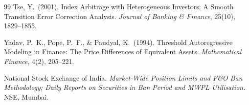 \begin{thebibliography}{99}
 Tse, Y.\ (2001). Index Arbitrage with Heterogeneous Investors: A Smooth Transition Error Correction Analysis. \emph{Journal of Banking \& Finance}, 25(10), 1829--1855.

 Yadav, P.\ K., Pope, P.\ F., \& Paudyal, K.\ (1994). Threshold Autoregressive Modeling in Finance: The Price Differences of Equivalent Assets. \emph{Mathematical Finance}, 4(2), 205--221.

 National Stock Exchange of India. \emph{Market-Wide Position Limits and F\&O Ban Methodology; Daily Reports on Securities in Ban Period and MWPL Utilisation.} NSE, Mumbai.

\end{thebibliography}

